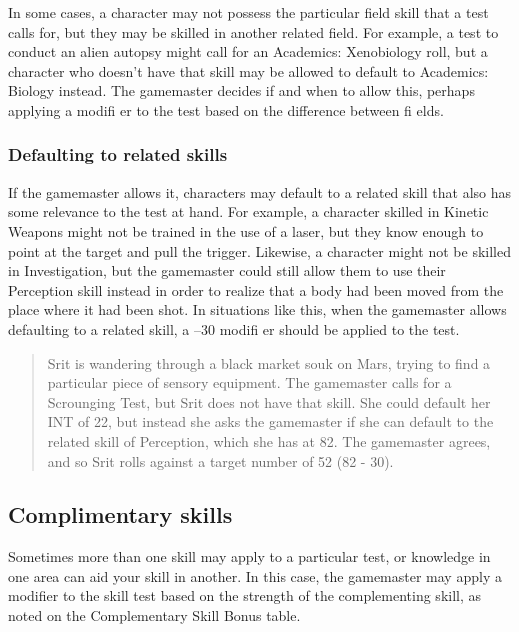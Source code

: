 In some cases, a character may not possess the particular field skill that a test calls for, but they may be skilled in another related field. For example, a test to conduct an alien autopsy might call for an Academics: Xenobiology roll, but a character who doesn’t have that skill may be allowed to default to Academics: Biology instead. The gamemaster decides if and when to allow this, perhaps applying a modifi er to the test based on the difference between fi elds.


\subsubsection{Defaulting to related skills}
\label{sec:defaultingtorelatedskills}

If the gamemaster allows it, characters may default to a related skill that also has some relevance to the test at hand. For example, a character skilled in Kinetic Weapons might not be trained in the use of a laser, but they know enough to point at the target and pull the trigger. Likewise, a character might not be skilled in Investigation, but the gamemaster could still allow them to use their Perception skill instead in order to realize that a body had been moved from the place where it had been shot. In situations like this, when the gamemaster allows defaulting to a related skill, a –30 modifi er should be applied to the test.

\begin{quotation}
Srit is wandering through a black market souk on Mars, trying to find a particular piece of sensory equipment. The gamemaster calls for a Scrounging Test, but Srit does not have that skill. She could default her INT of 22, but instead she asks the gamemaster if she can default to the related skill of Perception, which she has at 82. The gamemaster agrees, and so Srit rolls against a target number of 52 (82 - 30).
\end{quotation}



\subsection{Complimentary skills}
\label{sec:complimentaryskills}

Sometimes more than one skill may apply to a particular test, or knowledge in one area can aid your skill in another. In this case, the gamemaster may apply a modifier to the skill test based on the strength of the complementing skill, as noted on the Complementary
Skill Bonus table.

